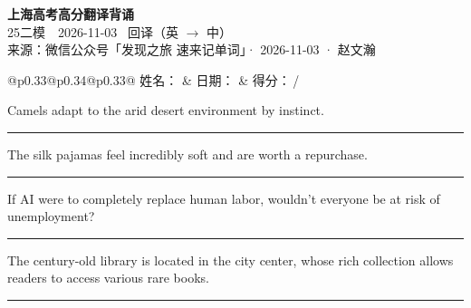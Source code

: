 \documentclass[11pt,a4paper]{article}
\newcommand{\num}[1]{\makebox[1.9em][r]{#1.}\hspace{0.3em}}
\newcommand{\wline}{\noindent\rule{\linewidth}{0.4pt}}
\begin{document}
\pagestyle{plain}
\begin{center}
{\LARGE\bfseries 上海高考高分翻译背诵 }\\[0.25em]
{\large 25二模　2026-11-03 \quad\ 回译（英 $\to$ 中）}\\[0.35em]
{\footnotesize 来源：微信公众号「发现之旅 速来记单词」· 2026-11-03 · 赵文瀚}
\end{center}

\vspace{0.4em}
\noindent\begin{tabular}{@{}p{0.33\textwidth}@{}p{0.34\textwidth}@{}p{0.33\textwidth}@{}}
姓名：\underline{\hspace{2.0cm}} & 日期：\underline{\hspace{2.0cm}} & 得分：\underline{\hspace{1.4cm}}\,/ \\
\end{tabular}

\vspace{0.5em}

\vspace{0.8em}
\num{1}Camels adapt to the arid desert environment by instinct.

\vspace{0.25em}

\wline

\num{2}The silk pajamas feel incredibly soft and are worth a repurchase.

\vspace{0.25em}

\wline

\num{3}If AI were to completely replace human labor, wouldn’t everyone be at risk of unemployment?

\vspace{0.25em}

\wline

\num{4}The century-old library is located in the city center, whose rich collection allows readers to access various rare books.

\vspace{0.25em}

\wline
\end{document}
